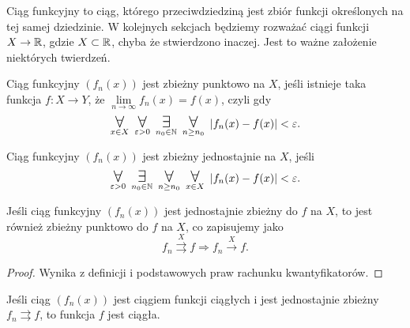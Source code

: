 Ciąg funkcyjny to ciąg, którego przeciwdziedziną jest zbiór funkcji określonych na tej samej dziedzinie. W kolejnych sekcjach będziemy rozważać ciągi funkcji $X \to \mathbb R$, gdzie $X \subset \mathbb R$, chyba że stwierdzono inaczej. Jest to ważne założenie niektórych twierdzeń.

\begin{definition}
    Ciąg funkcyjny $(f_n(x))$ jest zbieżny punktowo na $X$, jeśli istnieje taka funkcja $f: X \to Y$, że $\lim\limits_{n\to\infty} f_n(x) = f(x)$, czyli gdy
    \[ \dforall{x \in X} \dforall{\eps > 0} \dexists{n_0 \in \NN} \dforall{n \geq n_0} |f_n(x) - f(x)| < \eps. \]
\end{definition}

\begin{definition}
    Ciąg funkcyjny $(f_n(x))$ jest zbieżny jednostajnie na $X$, jeśli
    \[ \dforall{\eps > 0} \dexists{n_0 \in \NN} \dforall{n \geq n_0} \dforall{x \in X} |f_n(x) - f(x)| < \eps. \]
\end{definition}

\begin{theorem}
    \label{t:uniform convergence implies pointwise convergence}
    Jeśli ciąg funkcyjny $(f_n(x))$ jest jednostajnie zbieżny do $f$ na $X$, to jest również zbieżny punktowo do $f$ na $X$, co zapisujemy jako
    \[ f_n \overset{X}{\rightrightarrows} f \Longrightarrow f_n  \overset{X}{\rightarrow} f. \]
\end{theorem}
\begin{proof}
    Wynika z definicji i podstawowych praw rachunku kwantyfikatorów.
\end{proof}

\begin{theorem}
    \label{t:continuous limit}
    Jeśli ciąg $(f_n(x))$ jest ciągiem funkcji ciągłych i jest jednostajnie zbieżny $f_n \rightrightarrows f$, to funkcja $f$ jest ciągła.
\end{theorem}

